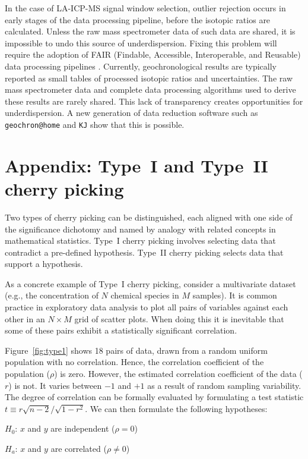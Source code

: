 \documentclass{article}
\begin{document}
In the case of LA-ICP-MS signal window selection, outlier rejection
occurs in early stages of the data processing pipeline, before the
isotopic ratios are calculated. Unless the raw mass spectrometer data
of such data are shared, it is impossible to undo this source of
underdispersion. Fixing this problem will require the adoption of FAIR
(Findable, Accessible, Interoperable, and Reusable) data processing
pipelines \citep{wilkinson2016}.  Currently, geochronological results
are typically reported as small tables of processed isotopic ratios
and uncertainties. The raw mass spectrometer data and complete data
processing algorithms used to derive these results are rarely
shared. This lack of transparency creates opportunities for
underdispersion.  A new generation of data reduction software such as
\texttt{geochron@home} \citep{vermeesch2026} and \texttt{KJ}
\citep{vermeesch2026b} show that this is possible.

\section*{Appendix: Type~I and Type~II cherry picking}

Two types of cherry picking can be distinguished, each aligned with
one side of the significance dichotomy and named by analogy with
related concepts in mathematical statistics. Type~I cherry picking
involves selecting data that contradict a pre-defined
hypothesis. Type~II cherry picking selects data that support a
hypothesis.\medskip

As a concrete example of Type~I cherry picking,
consider a multivariate dataset (e.g., the concentration of $N$
chemical species in $M$ samples). It is common practice in exploratory
data analysis to plot all pairs of variables against each other in an
$N\times{M}$ grid of scatter plots. When doing this it is inevitable
that some of these pairs exhibit a statistically significant
correlation.\medskip

Figure~\ref{fig:type1} shows 18 pairs of data, drawn from a random
uniform population with no correlation.  Hence, the correlation
coefficient of the population ($\rho$) is zero.  However, the estimated
correlation coefficient of the data ($r$) is not. It varies between
$-1$ and $+1$ as a result of random sampling variability.  The degree
of correlation can be formally evaluated by formulating a test
statistic $t \equiv r\sqrt{n-2}/\sqrt{1-r^2}$.  We can then formulate
the following hypotheses:

\begin{description}
\item{$H_0$:} $x$ and $y$ are independent ($\rho = 0$)
\item{$H_a$:} $x$ and $y$ are correlated ($\rho \neq 0$)
\end{description}
\end{document}
